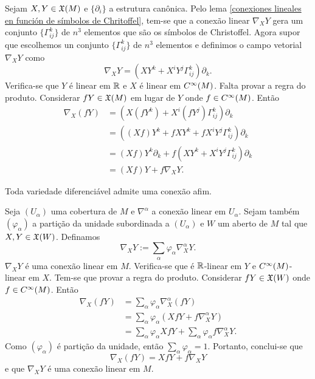 \begin{demonstracao}
	Sejam $X,Y \in \mathfrak{X}(M)$ e $\{ \partial_i \}$ a estrutura canônica. Pelo lema \ref{conexiones lineales en función de símbolos de Chritoffel}, tem-se que a conexão linear $\nabla_X Y$ gera um conjunto $\{ \Gamma_{ij}^k \}$ de $n^3$ elementos que são os símbolos de Christoffel. Agora supor que escolhemos un conjunto $\{ \Gamma_{ij}^k \} $ de $n^3$ elementos e definimos o campo vetorial $\nabla_X Y$ como
	\begin{equation*}
		\nabla_X Y = (X Y^k + X^i Y^j \Gamma_{ij}^k) \partial_k.
	\end{equation*}
	Verifica-se que $Y$ é linear em $\mathbb{R}$ e $X$ é linear em $C^\infty(M)$. Falta provar a regra do produto. Considerar $fY \in \mathfrak{X}(M)$ em lugar de $Y$ onde $f \in C^\infty(M)$. Então
	\begin{align*}
		\nabla_X (fY) &= (X(f Y^k) + X^i (f Y^j) \Gamma_{ij}^k) \partial_k\\
		&= ( (Xf) Y^k + f X Y^k + f X^i Y^j \Gamma_{ij}^k ) \partial_k\\
		&= (Xf) Y^k \partial_k + f (X Y^k + X^i Y^j \Gamma_{ij}^k) \partial_k\\
		&= (Xf) Y + f \nabla_X Y.
	\end{align*}
\end{demonstracao}

\begin{proposicao}
	Toda variedade diferenciável admite uma conexão afim.
\end{proposicao}

\begin{demonstracao}
	Seja $(U_{\alpha})$ uma cobertura de $M$ e $\nabla^{\alpha}$ a conexão linear em $U_{\alpha}$. Sejam também $(\varphi_{\alpha})$ a partição da unidade subordinada a $(U_{\alpha})$ e $W$ um aberto de $M$ tal que $X,Y \in \mathfrak{X}(W)$. Definamos
	\begin{equation*}
		\nabla_X Y := \sum_{\alpha} \varphi_{\alpha} \nabla_X^{\alpha} Y.
	\end{equation*}
	$\nabla_X Y$ é uma conexão linear em $M$. Verifica-se que é $\mathbb{R}$-linear em $Y$ e $C^\infty(M)$-linear em $X$. Tem-se que provar a regra do produto. Considerar $fY \in \mathfrak{X}(W)$ onde $f \in C^\infty(M)$. Então
	\begin{align*}
		\nabla_X (fY) &= \sum_{\alpha} \varphi_{\alpha} \nabla_X^{\alpha} (fY)\\
		&= \sum_{\alpha} \varphi_{\alpha} (Xf Y + f \nabla_X^{\alpha} Y)\\
		&= \sum_{\alpha} \varphi_{\alpha} X f Y + \sum_{\alpha} \varphi_{\alpha} f \nabla_X^{\alpha} Y. 
	\end{align*}
	Como $(\varphi_{\alpha})$ é partição da unidade, então $\sum_{\alpha} \varphi_{\alpha} = 1$. Portanto, conclui-se que
	\begin{equation*}
		\nabla_X (fY) = X f Y + f \nabla_X Y
	\end{equation*}
	e que $\nabla_X Y$ é uma conexão linear em $M$.
\end{demonstracao}




